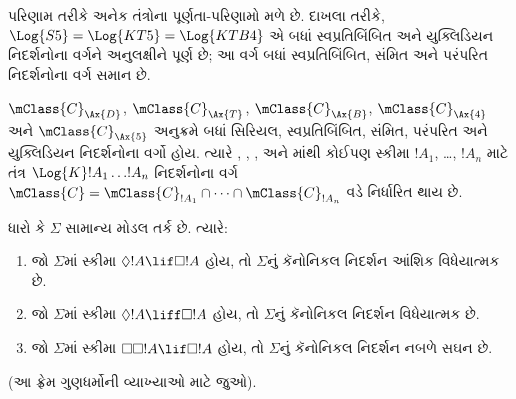 પરિણામ તરીકે અનેક તંત્રોના પૂર્ણતા-પરિણામો મળે છે. દાખલા તરીકે,
$\Log{S5} = \Log{KT5} = \Log{KTB4}$ એ બધાં સ્વપ્રતિબિંબિત અને
યુક્લિડિયન નિદર્શનોના વર્ગને અનુલક્ષીને પૂર્ણ છે; આ વર્ગ બધાં
સ્વપ્રતિબિંબિત, સંમિત અને પરંપરિત નિદર્શનોના વર્ગ સમાન છે.

\begin{thm}
  $\mClass{C}_\Ax{D}$, $\mClass{C}_\Ax{T}$,
  $\mClass{C}_\Ax{B}$, $\mClass{C}_\Ax{4}$ અને
  $\mClass{C}_\Ax{5}$ અનુક્રમે બધાં સિરિયલ, સ્વપ્રતિબિંબિત,
  સંમિત, પરંપરિત અને યુક્લિડિયન નિદર્શનોના વર્ગો હોય. ત્યારે
  , , ,  અને માંથી કોઈપણ
  સ્કીમા $!A_1$, \dots, $!A_n$ માટે તંત્ર
  $\Log{K}!A_1 \dots !A_n$ નિદર્શનોના વર્ગ
  $\mClass{C} = \mClass{C}_{!A_1} \cap \dots
  \cap \mClass{C}_{!A_n}$ વડે નિર્ધારિત થાય છે.
\end{thm}

\begin{prop}
  ધારો કે $\Sigma$ સામાન્ય મોડલ તર્ક છે. ત્યારે:
  \begin{enumerate}
  \item{}%
    જો $\Sigma$માં સ્કીમા $\Diamond!A \lif \Box
    !A$ હોય, તો $\Sigma$નું કૅનોનિકલ નિદર્શન આંશિક વિધેયાત્મક છે.
  \item જો $\Sigma$માં સ્કીમા $\Diamond!A \liff \Box
    !A$ હોય, તો $\Sigma$નું કૅનોનિકલ નિદર્શન વિધેયાત્મક છે.
  \item જો $\Sigma$માં સ્કીમા $\Box\Box!A \lif \Box
    !A$ હોય, તો $\Sigma$નું કૅનોનિકલ નિદર્શન નબળે સઘન છે.
  \end{enumerate}
(આ ફ્રેમ ગુણધર્મોની વ્યાખ્યાઓ માટે 
  જુઓ).
\end{prop}

